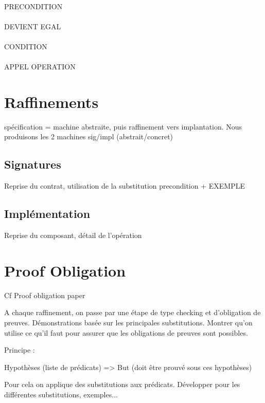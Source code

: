 \paragraph{}
PRECONDITION

\paragraph{}
DEVIENT EGAL

\paragraph{}
CONDITION

\paragraph{}
APPEL OPERATION





\section{Raffinements}
spécification = machine abstraite, puis raffinement vers
implantation.
Nous produisons les 2 machines sig/impl (abstrait/concret)

\subsection{Signatures}

Reprise du contrat, utilisation de la substitution precondition
+
EXEMPLE

\subsection{Implémentation}

Reprise du composant, détail de l'opération



\section{Proof Obligation}
Cf Proof obligation paper

A chaque raffinement, on passe par une étape de type checking et
d'obligation de preuves. Démonstrations basée sur les principales
substitutions. Montrer qu'on utilise ce qu'il faut pour assurer que
les obligations de preuves sont possibles.

Principe :

Hypothèses (liste de prédicats)
=>
But (doit être prouvé sous ces hypothèses)

Pour cela on applique des substitutions aux prédicats. Développer pour les
différentes substitutions, exemples...

